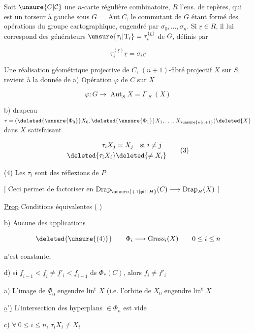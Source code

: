 

Soit $\unsure{C|\mathcal C}$ une $n$-carte régulière combinatoire,  $R$ l'ens. de  repères, qui est un torseur à gauche sous $G=\operatorname{Aut}C$, le commutant de $G$ étant formé des opérations du groupe cartographique, engendré par $\sigma_0,\ldots,\sigma_n$. Si $\underline r\in R$, il lui correspond des générateurs $\unsure{\tau_i|\mathrm T_i}=\tau_i^{(\underline r)}$ de $G$, définis par

\[
\tau_i^{(\underline r)}\underline r=\sigma_i\underline r \tag*{(1)}
\]

Une réalisation géométrique projective de $C$,  $(n+1)$-fibré projectif $X$ sur $S$, revient à la donnée de a) Opération $\varphi$ de $C$ sur $X$

\[
\varphi:G\longrightarrow\operatorname{Aut}_S X=\Gamma\mathop{\underline{\operatorname{Aut}}}\nolimits_S(X)\tag*{(2)}
\]

b) drapeau  $r=(\deleted{\unsure{\Phi_0}}X_0,\deleted{\unsure{\Phi_1}}X_1,\ldots,X_{\unsure{n|n+1}})\deleted{X}$ dans $X$  satisfaisant

\[
\begin{aligned}
\tau_iX_j&=X_j\quad\text{si } i\ne j\\
\deleted{\tau_iX_i}&\deleted{\ne X_i}
\end{aligned}\tag*{(3)}
\]

(4) Les $\tau_i$ sont des réflexions de $P$

[ Ceci permet de  factoriser en $\operatorname{Drap}_{\unsure{+1|\ne1|H}}(C)\longrightarrow\operatorname{Drap}_{H}(X)$ ]

\uline{Prop} Conditions équivalentes (  )

b) Aucune des applications

\[
\deleted{\unsure{(4)}}\qquad \Phi_i\longrightarrow\operatorname{Grass}_i(X)\qquad 0\leq i\leq n
\]

n'est constante, 



d) si $\underline f_{i-1}<\underline f_i\ne\underline f'_i<\underline f_{i+1}$ ds $\Phi_*(C)$, alors $f_i\ne f'_i$

a) L'image de $\underline\Phi_0$ engendre lin$^{\mathrm t}$ $X$ (i.e. l'orbite de $X_0$ engendre lin$^{\mathrm t}$ $X$

\uline{a$'$)} L'intersection des hyperplans $\in\Phi_n$ est vide

 c) $\forall\ 0\leq i\leq n$, $\tau_iX_i\ne X_i$

